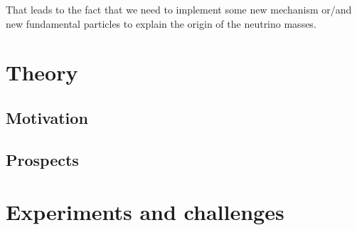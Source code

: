 \documentclass[../main.tex]{subfiles}
\begin{document}
That leads to the fact that we need to implement some new mechanism or/and new fundamental particles to explain the origin of the neutrino masses.



\section{Theory}

\subsection{Motivation}

\subsection{Prospects}


\section{Experiments and challenges}
\end{document}
